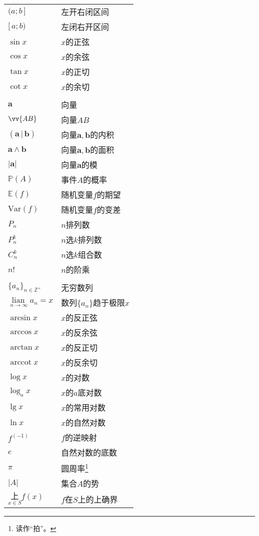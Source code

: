 \documentclass[12pt,UTF8]{article}
\newcommand{\lian}[1]{
    \underset{#1}{\operatorname{lian}\,}
}
\newcommand{\arccot}{\operatorname{arccot}}
\begin{document}
\begin{longtable}{ m{15em} m{15em} }
    $(a;b\,]$ & 左开右闭区间 \\
    $[\,a;b)$ & 左闭右开区间 \\
    $\sin{x}$ & $x$的正弦 \\
    $\cos{x}$ & $x$的余弦 \\
    $\tan{x}$ & $x$的正切 \\
    $\cot{x}$ & $x$的余切 \\
    & \\
    $\mathbf{a}$ & 向量 \\
    $\vv{AB}$ & 向量$AB$\\
    $(\mathbf{a}\, | \, \mathbf{b})$ & 向量$\mathbf{a},\mathbf{b}$的内积 \\
    $\mathbf{a}\wedge \mathbf{b}$ & 向量$\mathbf{a},\mathbf{b}$的面积 \\
    $|\mathbf{a}|$ & 向量$\mathbf{a}$的模 \\
    $\mathbb{P}(A)$ & 事件$A$的概率 \\
    $\mathbb{E}(f)$ & 随机变量$f$的期望 \\
    $\mathrm{Var}(f)$ & 随机变量$f$的变差 \\
    $P_n$ & $n$排列数 \\
    $P_n^k$ & $n$选$k$排列数 \\
    $C_n^k$ & $n$选$k$组合数 \\
    $n!$ & $n$的阶乘 \\
    & \\
    $\displaystyle\{a_n\}_{n\in\mathbb{Z}^+}$ & 无穷数列 \\
    $\lian{n\to \infty} a_n = x$ & 数列$\{a_n\}$趋于极限$x$ \\
    $\arcsin{x}$ & $x$的反正弦 \\
    $\arccos{x}$ & $x$的反余弦 \\
    $\arctan{x}$ & $x$的反正切 \\
    $\arccot{x}$ & $x$的反余切 \\
    $\log{x}$ & $x$的对数 \\
    $\log_a{x}$ & $x$的$a$底对数 \\
    $\lg{x}$ & $x$的常用对数 \\
    $\ln{x}$ & $x$的自然对数 \\
    $f^{(-1)}$ & $f$的逆映射 \\
    $e$ & 自然对数的底数 \\
    $\pi$ & 圆周率\footnote{读作“拍”。} \\
    $|A|$ & 集合$A$的势 \\
    $\underset{x\in S}{\text{上}} f(x)$ & $f$在$S$上的上确界\\

\end{longtable}
\end{document}
